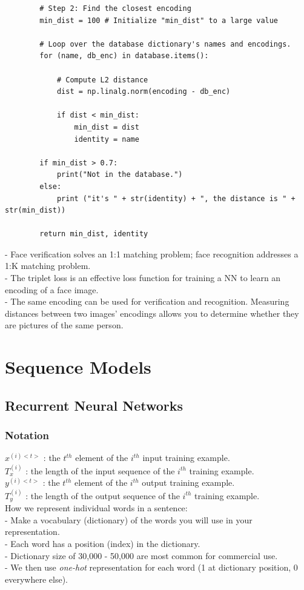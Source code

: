 \documentclass[11pt, a4paper]{article}
\begin{document}
\begin{spacing}{1.1}
\begin{lstlisting}
		# Step 2: Find the closest encoding 
		min_dist = 100 # Initialize "min_dist" to a large value
		
		# Loop over the database dictionary's names and encodings.
		for (name, db_enc) in database.items():
			
			# Compute L2 distance
			dist = np.linalg.norm(encoding - db_enc)
			
			if dist < min_dist:
				min_dist = dist
				identity = name
		
		if min_dist > 0.7:
			print("Not in the database.")
		else:
			print ("it's " + str(identity) + ", the distance is " + str(min_dist))
		
		return min_dist, identity \end{lstlisting} \vspace*{1mm}
	- Face verification solves an 1:1 matching problem; face recognition addresses a 1:K matching problem. \\
	- The triplet loss is an effective loss function for training a NN to learn an encoding of a face image. \\
	- The same encoding can be used for verification and recognition. Measuring distances between two \hspace*{2mm} images' encodings allows you to determine whether they are pictures of the same person. \newpage

	\section{Sequence Models}
	\subsection{Recurrent Neural Networks}
	\subsubsection{Notation}
	$x^{(i)<t>}$ : the $t^{th}$ element of the $i^{th}$ input training example. \\
	$T_x^{(i)}$ : the length of the input sequence of the $i^{th}$ training example. \\
	$y^{(i)<t>}$ : the $t^{th}$ element of the $i^{th}$ output training example. \\
	$T_y^{(i)}$ : the length of the output sequence of the $i^{th}$ training example. \vspace*{2mm}\\
	How we represent individual words in a sentence: \\
	- Make a vocabulary (dictionary) of the words you will use in your representation. \\
	- Each word has a position (index) in the dictionary. \\
	- Dictionary size of 30,000 - 50,000 are most common for commercial use. \\
	- We then use \textit{one-hot} representation for each word (1 at dictionary position, 0 everywhere else).
	

\end{spacing}
\end{document}

